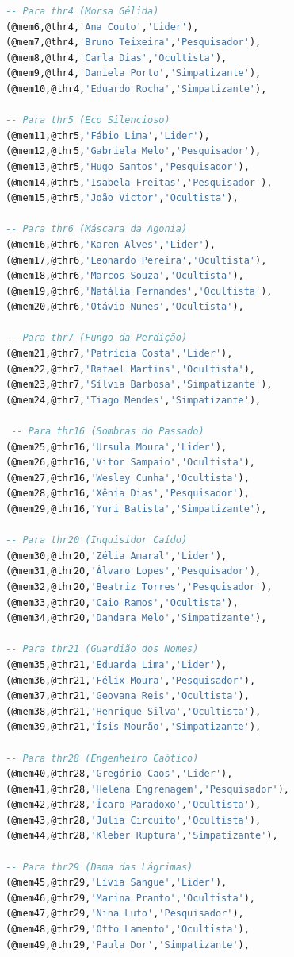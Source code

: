 \documentclass[12pt,a4paper]{report}
\begin{document}
\begin{lstlisting}[language=SQL, caption=population.sql]
-- Para thr4 (Morsa Gélida)
(@mem6,@thr4,'Ana Couto','Lider'),
(@mem7,@thr4,'Bruno Teixeira','Pesquisador'),
(@mem8,@thr4,'Carla Dias','Ocultista'),
(@mem9,@thr4,'Daniela Porto','Simpatizante'),
(@mem10,@thr4,'Eduardo Rocha','Simpatizante'),

-- Para thr5 (Eco Silencioso)
(@mem11,@thr5,'Fábio Lima','Lider'),
(@mem12,@thr5,'Gabriela Melo','Pesquisador'),
(@mem13,@thr5,'Hugo Santos','Pesquisador'),
(@mem14,@thr5,'Isabela Freitas','Pesquisador'),
(@mem15,@thr5,'João Victor','Ocultista'),

-- Para thr6 (Máscara da Agonia)
(@mem16,@thr6,'Karen Alves','Lider'),
(@mem17,@thr6,'Leonardo Pereira','Ocultista'),
(@mem18,@thr6,'Marcos Souza','Ocultista'),
(@mem19,@thr6,'Natália Fernandes','Ocultista'),
(@mem20,@thr6,'Otávio Nunes','Ocultista'),

-- Para thr7 (Fungo da Perdição)
(@mem21,@thr7,'Patrícia Costa','Lider'),
(@mem22,@thr7,'Rafael Martins','Ocultista'),
(@mem23,@thr7,'Sílvia Barbosa','Simpatizante'),
(@mem24,@thr7,'Tiago Mendes','Simpatizante'),

 -- Para thr16 (Sombras do Passado)
(@mem25,@thr16,'Ursula Moura','Lider'),
(@mem26,@thr16,'Vitor Sampaio','Ocultista'),
(@mem27,@thr16,'Wesley Cunha','Ocultista'),
(@mem28,@thr16,'Xênia Dias','Pesquisador'),
(@mem29,@thr16,'Yuri Batista','Simpatizante'),

-- Para thr20 (Inquisidor Caído)
(@mem30,@thr20,'Zélia Amaral','Lider'),
(@mem31,@thr20,'Álvaro Lopes','Pesquisador'),
(@mem32,@thr20,'Beatriz Torres','Pesquisador'),
(@mem33,@thr20,'Caio Ramos','Ocultista'),
(@mem34,@thr20,'Dandara Melo','Simpatizante'),

-- Para thr21 (Guardião dos Nomes)
(@mem35,@thr21,'Eduarda Lima','Lider'),
(@mem36,@thr21,'Félix Moura','Pesquisador'),
(@mem37,@thr21,'Geovana Reis','Ocultista'),
(@mem38,@thr21,'Henrique Silva','Ocultista'),
(@mem39,@thr21,'Ísis Mourão','Simpatizante'),

-- Para thr28 (Engenheiro Caótico)
(@mem40,@thr28,'Gregório Caos','Lider'),
(@mem41,@thr28,'Helena Engrenagem','Pesquisador'),
(@mem42,@thr28,'Ícaro Paradoxo','Ocultista'),
(@mem43,@thr28,'Júlia Circuito','Ocultista'),
(@mem44,@thr28,'Kleber Ruptura','Simpatizante'),

-- Para thr29 (Dama das Lágrimas)
(@mem45,@thr29,'Lívia Sangue','Lider'),
(@mem46,@thr29,'Marina Pranto','Ocultista'),
(@mem47,@thr29,'Nina Luto','Pesquisador'),
(@mem48,@thr29,'Otto Lamento','Ocultista'),
(@mem49,@thr29,'Paula Dor','Simpatizante'),


\end{lstlisting}
\end{document}
